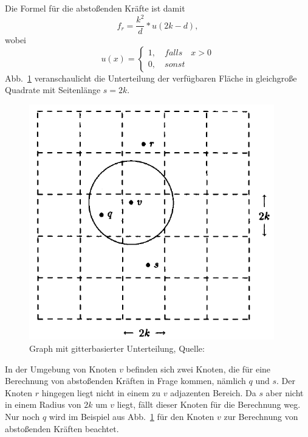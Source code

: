 \documentclass[12pt, a4paper]{article}
\begin{document}
Die Formel für die abstoßenden Kräfte ist damit
\begin{equation} \label{repForceU}
f_r = \frac{k^2}{d}*u(2k-d),
\end{equation}
wobei
\begin{equation} \label{uFunction}
u(x) = \begin{cases} 1, \quad falls \quad x>0 \\ 0, \quad sonst \end{cases}
\end{equation}
Abb.~\ref{fruchtermanReingoldGridBased} veranschaulicht die Unterteilung der verfügbaren Fläche in gleichgroße Quadrate mit Seitenlänge $s=2k$.\\

\begin{figure}[h!]
\centering
\includegraphics[width=0.95\textwidth]{fruchtermanReingoldGridBased.png}
\caption[Graph mit gitterbasierter Unterteilung]{Graph mit gitterbasierter Unterteilung, Quelle: \protect{}}
\label{fruchtermanReingoldGridBased}
\end{figure}

In der Umgebung von Knoten $v$ befinden sich zwei Knoten, die für eine Berechnung von abstoßenden Kräften in Frage kommen, nämlich $q$ und $s$. Der Knoten $r$ hingegen liegt nicht in einem zu $v$ adjazenten Bereich. Da $s$ aber nicht in einem Radius von $2k$ um $v$ liegt, fällt dieser Knoten für die Berechnung weg. Nur noch $q$ wird im Beispiel aus Abb.~\ref{fruchtermanReingoldGridBased} für den Knoten $v$ zur Berechnung von abstoßenden Kräften beachtet.\\
\end{document}
